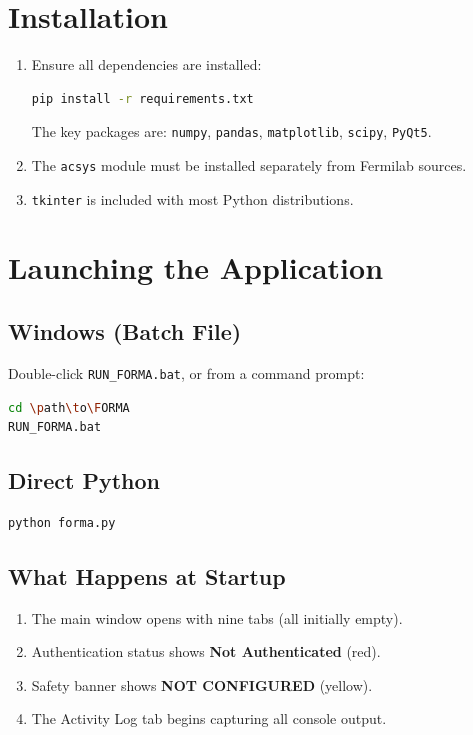 \documentclass[11pt,a4paper,twoside]{report}
\begin{document}
\section{Installation}

\begin{enumerate}
  \item Ensure all dependencies are installed:
    \begin{lstlisting}[language=bash]
pip install -r requirements.txt
    \end{lstlisting}
    The key packages are: \texttt{numpy}, \texttt{pandas}, \texttt{matplotlib}, \texttt{scipy}, \texttt{PyQt5}.
  \item The \texttt{acsys} module must be installed separately from Fermilab sources.
  \item \texttt{tkinter} is included with most Python distributions.
\end{enumerate}

\section{Launching the Application}

\subsection{Windows (Batch File)}

Double-click \texttt{RUN\_FORMA.bat}, or from a command prompt:
\begin{lstlisting}[language=bash]
cd \path\to\FORMA
RUN_FORMA.bat
\end{lstlisting}

\subsection{Direct Python}

\begin{lstlisting}[language=bash]
python forma.py
\end{lstlisting}

\subsection{What Happens at Startup}

\begin{enumerate}
  \item The main window opens with nine tabs (all initially empty).
  \item Authentication status shows \textcolor{dangercol}{\textbf{Not Authenticated}} (red).
  \item Safety banner shows \textcolor{warncol}{\textbf{NOT CONFIGURED}} (yellow).
  \item The Activity Log tab begins capturing all console output.
\end{enumerate}
\end{document}
